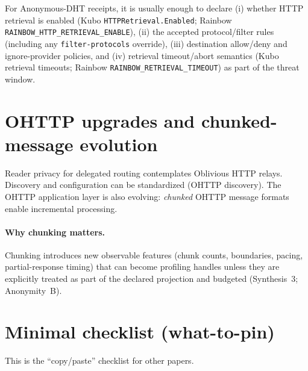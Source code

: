 \documentclass[11pt]{article}
\begin{document}
For Anonymous-DHT receipts, it is usually enough to declare (i) whether HTTP retrieval is enabled (Kubo \texttt{HTTPRetrieval.Enabled}; Rainbow \texttt{RAINBOW\_HTTP\_RETRIEVAL\_ENABLE}), (ii) the accepted protocol/filter rules (including any \texttt{filter-protocols} override)\cite{ipip0484,kuboEnvVars}, (iii) destination allow/deny and ignore-provider policies, and (iv) retrieval timeout/abort semantics (Kubo retrieval timeouts; Rainbow \texttt{RAINBOW\_RETRIEVAL\_TIMEOUT}) as part of the threat window.\cite{series:threatwindows,rainbowEnvVars,kuboConfigHTTPRetrieval,kuboConfigPathRouting}

\section{OHTTP upgrades and chunked-message evolution}
Reader privacy for delegated routing contemplates Oblivious HTTP relays.\cite{rfc9458OHTTP,ipip0421Draft}
Discovery and configuration can be standardized (OHTTP discovery).\cite{rfc9540OHTTPDiscovery}
The OHTTP application layer is also evolving: \emph{chunked} OHTTP message formats enable incremental processing.\cite{draftChunkedOHTTP}

\paragraph{Why chunking matters.}
Chunking introduces new observable features (chunk counts, boundaries, pacing, partial-response timing) that can become profiling handles unless they are explicitly treated as part of the declared projection and budgeted (Synthesis~3; Anonymity~B).\cite{series:traceifaces,series:profiling}

\section{Minimal checklist (what-to-pin)}
This is the ``copy/paste'' checklist for other papers.
\end{document}
